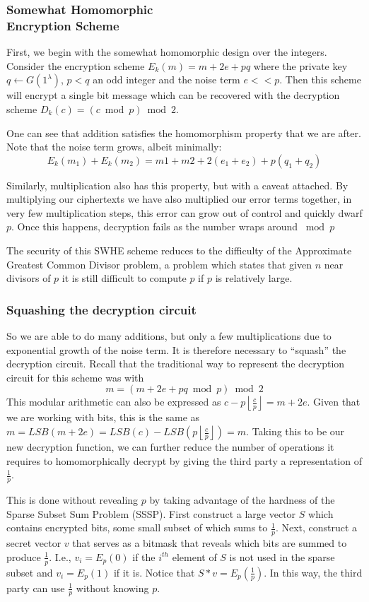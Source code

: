 \documentclass[letterpaper,twocolumn,10pt]{article}
\newcommand{\floor}[1]{\left\lfloor #1 \right\rfloor}
\begin{document}
\subsubsection{Somewhat Homomorphic \\Encryption Scheme} 
First, we begin with the somewhat homomorphic design over the integers. Consider the encryption scheme $E_k(m) = m + 2e + pq$ where the private key $q \leftarrow G(1^\lambda)$, $p < q$ an odd integer and the noise term $e << p$. Then this scheme will encrypt a single bit message which can be recovered with the decryption scheme $D_k(c) = (c \bmod p) \bmod 2$.

One can see that addition satisfies the homomorphism property that we are after. Note that the noise term grows, albeit minimally:
$$E_k(m_1)+E_k(m_2)=m1+m2 + 2(e_1+e_2) + p(q_1+q_2)$$

Similarly, multiplication also has this property, but with a caveat attached. By multiplying our ciphertexts we have also multiplied our error terms together, in very few multiplication steps, this error can grow out of control and quickly dwarf $p$. Once this happens, decryption fails as the number wraps around $\bmod p$

The security of this SWHE scheme reduces to the difficulty of the Approximate Greatest Common Divisor problem, a problem which states that given $n$ near divisors of $p$ it is still difficult to compute $p$ if $p$ is relatively large.

\subsubsection{Squashing the decryption circuit}
So we are able to do many additions, but only a few multiplications due to exponential growth of the noise term. It is therefore necessary to ``squash'' the decryption circuit. Recall that the traditional way to represent the decryption circuit for this scheme was with
$$m = (m + 2e + pq \bmod p) \bmod 2$$ 
This modular arithmetic can also be expressed as $c- p\floor{\frac{c}{p}} = m + 2e$. Given that we are working with bits, this is the same as $m = LSB(m + 2e) = LSB(c) - LSB(p\floor{\frac{c}{p}}) = m$. Taking this to be our new decryption function, we can further reduce the number of operations it requires to homomorphically decrypt by giving the third party a representation of $\frac{1}{p}$.

This is done without revealing $p$ by taking advantage of the hardness of the Sparse Subset Sum Problem (SSSP). First construct a large vector $S$ which contains encrypted bits, some small subset of which sums to $\frac{1}{p}$. Next, construct a secret vector $v$ that serves as a bitmask that reveals which bits are summed to produce $\frac{1}{p}$. I.e., $v_i = E_p(0)$ if the $i^{th}$ element of $S$ is not used in the sparse subset and $v_i = E_p(1)$ if it is. Notice that $S*v = E_p(\frac{1}{p})$. In this way, the third party can use $\frac{1}{p}$ without knowing $p$.
\end{document}
